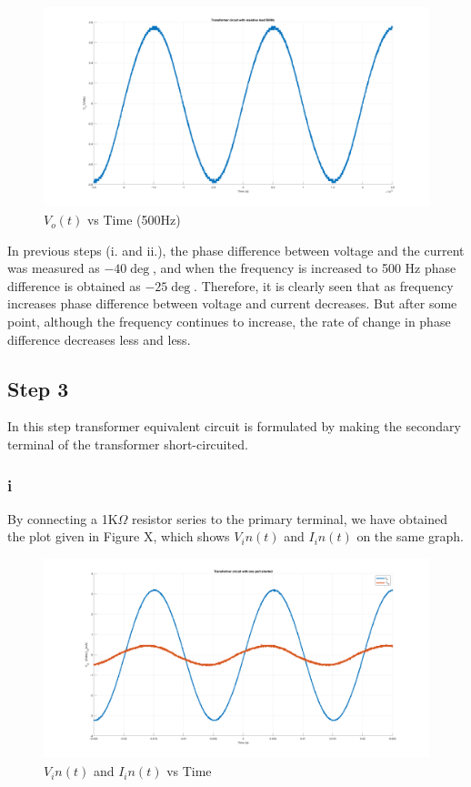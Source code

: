 \documentclass[letterpaper,12pt]{article}
\begin{document}
\begin{figure}[H]
    \centering
    \includegraphics[width = 1\textwidth]{2_3_2.png}
    \caption{\(V_o(t) \) vs Time (500Hz)}
\end{figure} 

In previous steps (i. and ii.), the phase difference between voltage and the current was measured as \(-40\deg \), and when the frequency is increased to 500 Hz phase difference is obtained as \(-25\deg\). Therefore, it is clearly seen that as frequency increases phase difference between voltage and current decreases. But after some point, although the frequency continues to increase, the rate of change in phase difference decreases less and less. 
%
\subsection{Step 3}
In this step transformer equivalent circuit is formulated by making the secondary terminal of the transformer short-circuited.
\subsubsection{i}


%
By connecting a 1K\(\Omega\) resistor series to the primary terminal, we have obtained the plot given in Figure X, which shows \(V_in(t) \) and \(I_in(t)\) on the same graph.  
\begin{figure}[H]
    \centering
    \includegraphics[width = 1\textwidth]{3_1.png}
    \caption{\(V_in(t) \) and \(I_in(t)\) vs Time }
\end{figure} 
\end{document}
